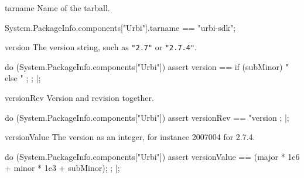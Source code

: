 \begin{urbiscriptapi}
\item[tarname] Name of the tarball.
\begin{urbiassert}
System.PackageInfo.components["Urbi"].tarname
  == "urbi-sdk";
\end{urbiassert}


\item[version] The version string, such as \lstinline|"2.7"| or
  \lstinline|"2.7.4"|.
\begin{urbiscript}
do (System.PackageInfo.components["Urbi"])
{
  assert
  {
    version ==
      {
        if (subMinor)
          "%
        else
          "%
      };
  };
}|;
\end{urbiscript}


\item[versionRev] Version and revision together.
\begin{urbiscript}
do (System.PackageInfo.components["Urbi"])
{
  assert
  {
    versionRev
    == "version %
  };
}|;
\end{urbiscript}


\item[versionValue] The version as an integer, for instance 2007004 for
  2.7.4.
\begin{urbiscript}
do (System.PackageInfo.components["Urbi"])
{
  assert
  {
    versionValue == (major * 1e6 + minor * 1e3 + subMinor);
  };
}|;
\end{urbiscript}
\end{urbiscriptapi}

